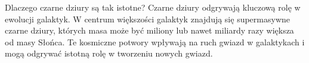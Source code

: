 \begin{frame}{Dlaczego czarne dziury są tak istotne?}
Czarne dziury odgrywają kluczową rolę w ewolucji galaktyk. W centrum większości galaktyk znajdują się supermasywne czarne dziury, których masa może być miliony lub nawet miliardy razy większa od masy Słońca. Te kosmiczne potwory wpływają na ruch gwiazd w galaktykach i mogą odgrywać istotną rolę w tworzeniu nowych gwiazd.
\end{frame}
